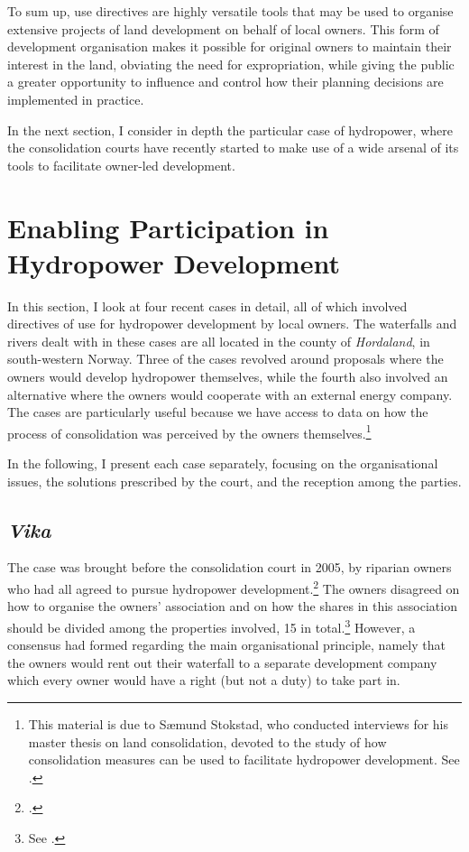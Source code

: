 To sum up, use directives are highly versatile tools that may be used to organise extensive projects of land development on behalf of local owners. This form of development organisation makes it possible for original owners to maintain their interest in the land, obviating the need for expropriation, while giving the public a greater opportunity to influence and control how their planning decisions are implemented in practice.

In the next section, I consider in depth the particular case of hydropower, where the consolidation courts have recently started to make use of a wide arsenal of its tools to facilitate owner-led development.

\section{Enabling Participation in Hydropower Development}\label{sec:6:4}

In this section, I look at four recent cases in detail, all of which involved directives of use for hydropower development by local owners. The waterfalls and rivers dealt with in these cases are all located in the county of \emph{Hordaland}, in south-western Norway. Three of the cases revolved around proposals where the owners would develop hydropower themselves,  while the fourth also involved an alternative where the owners would cooperate with an external energy company. The cases are particularly useful because we have access to data on how the process of consolidation was perceived by the owners themselves.\footnote{This material is due to Sæmund Stokstad, who conducted interviews for his master thesis on land consolidation, devoted to the study of how consolidation measures can be used to facilitate hydropower development. See \cite{stokstad11}.}

In the following, I present each case separately, focusing on the organisational issues, the solutions prescribed by the court, and the reception among the parties.

\subsection{\emph{Vika}}\label{sec:6:4:1}

The case was brought before the consolidation court in 2005, by riparian owners who had all agreed to pursue hydropower development.\footcite{vika05} The owners disagreed on how to organise the owners' association and on how the shares in this association should be divided among the properties involved, 15 in total.\footnote{See \cite[25-28]{stokstad11}.} However, a consensus had formed regarding the main organisational principle, namely that the owners would rent out their waterfall to a separate development company which every owner would have a right (but not a duty) to take part in. 

